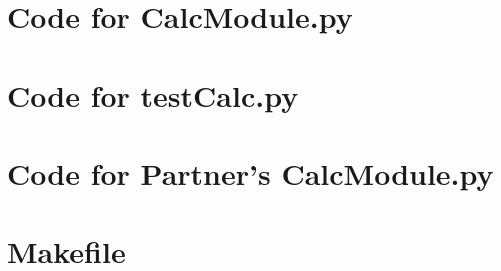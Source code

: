 \documentclass[12pt]{article}
\begin{document}
\newpage

\section{Code for CalcModule.py}

\noindent 

\newpage

\section{Code for testCalc.py}

\noindent 

\newpage

\section{Code for Partner's CalcModule.py}

\noindent 

\newpage

\section{Makefile}

\lstset{language=make}
\noindent 
\end{document}
